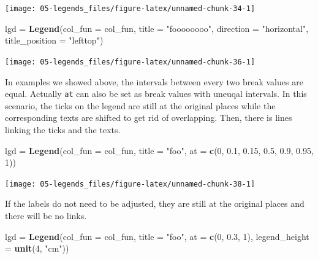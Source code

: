 \documentclass[]{book}
\newenvironment{Shaded}{\begin{snugshade}}{\end{snugshade}}
\newcommand{\KeywordTok}[1]{\textcolor[rgb]{0.13,0.29,0.53}{\textbf{#1}}}
\newcommand{\DataTypeTok}[1]{\textcolor[rgb]{0.13,0.29,0.53}{#1}}
\newcommand{\DecValTok}[1]{\textcolor[rgb]{0.00,0.00,0.81}{#1}}
\newcommand{\FloatTok}[1]{\textcolor[rgb]{0.00,0.00,0.81}{#1}}
\newcommand{\StringTok}[1]{\textcolor[rgb]{0.31,0.60,0.02}{#1}}
\newcommand{\NormalTok}[1]{#1}
\theoremstyle{definition}
\theoremstyle{definition}
\theoremstyle{definition}
\theoremstyle{remark}
\begin{document}
\begin{center}\texttt{[image: 05-legends\_files/figure-latex/unnamed-chunk-34-1]} \end{center}

\begin{Shaded}
\begin{Highlighting}[]
\NormalTok{lgd =}\StringTok{ }\KeywordTok{Legend}\NormalTok{(}\DataTypeTok{col_fun =}\NormalTok{ col_fun, }\DataTypeTok{title =} \StringTok{"foooooooo"}\NormalTok{, }\DataTypeTok{direction =} \StringTok{"horizontal"}\NormalTok{, }
    \DataTypeTok{title_position =} \StringTok{"lefttop"}\NormalTok{)}
\end{Highlighting}
\end{Shaded}

\begin{center}\texttt{[image: 05-legends\_files/figure-latex/unnamed-chunk-36-1]} \end{center}

In examples we showed above, the intervals between every two break
values are equal. Actually \texttt{at} can also be set as break values
with uneuqal intervals. In this scenario, the ticks on the legend are
still at the original places while the corresponding texts are shifted
to get rid of overlapping. Then, there is lines linking the ticks and
the texts.

\begin{Shaded}
\begin{Highlighting}[]
\NormalTok{lgd =}\StringTok{ }\KeywordTok{Legend}\NormalTok{(}\DataTypeTok{col_fun =}\NormalTok{ col_fun, }\DataTypeTok{title =} \StringTok{"foo"}\NormalTok{, }\DataTypeTok{at =} \KeywordTok{c}\NormalTok{(}\DecValTok{0}\NormalTok{, }\FloatTok{0.1}\NormalTok{, }\FloatTok{0.15}\NormalTok{, }\FloatTok{0.5}\NormalTok{, }\FloatTok{0.9}\NormalTok{, }\FloatTok{0.95}\NormalTok{, }\DecValTok{1}\NormalTok{))}
\end{Highlighting}
\end{Shaded}

\begin{center}\texttt{[image: 05-legends\_files/figure-latex/unnamed-chunk-38-1]} \end{center}

If the labels do not need to be adjusted, they are still at the original
places and there will be no links.

\begin{Shaded}
\begin{Highlighting}[]
\NormalTok{lgd =}\StringTok{ }\KeywordTok{Legend}\NormalTok{(}\DataTypeTok{col_fun =}\NormalTok{ col_fun, }\DataTypeTok{title =} \StringTok{"foo"}\NormalTok{, }\DataTypeTok{at =} \KeywordTok{c}\NormalTok{(}\DecValTok{0}\NormalTok{, }\FloatTok{0.3}\NormalTok{, }\DecValTok{1}\NormalTok{), }
    \DataTypeTok{legend_height =} \KeywordTok{unit}\NormalTok{(}\DecValTok{4}\NormalTok{, }\StringTok{"cm"}\NormalTok{))}
\end{Highlighting}
\end{Shaded}
\end{document}
